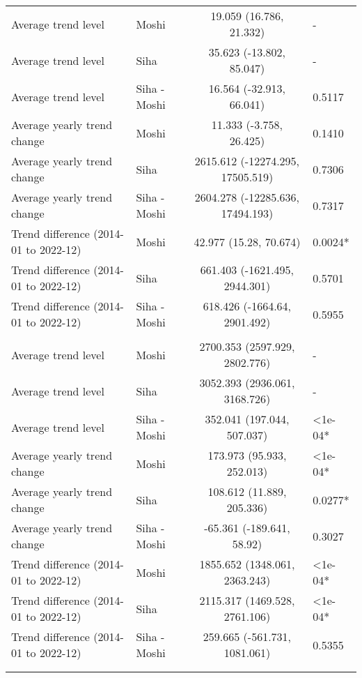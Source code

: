 \begin{longtable}{l|lcl}
\midrule\addlinespace[2.5pt]
\multicolumn{4}{l}{Typhoid} \\ 
\midrule\addlinespace[2.5pt]
Average trend level & Moshi & 19.059 (16.786, 21.332) & - \\ 
Average trend level & Siha & 35.623 (-13.802, 85.047) & - \\ 
Average trend level & Siha - Moshi & 16.564 (-32.913, 66.041) & 0.5117 \\ 
Average yearly trend change & Moshi & 11.333 (-3.758, 26.425) & 0.1410 \\ 
Average yearly trend change & Siha & 2615.612 (-12274.295, 17505.519) & 0.7306 \\ 
Average yearly trend change & Siha - Moshi & 2604.278 (-12285.636, 17494.193) & 0.7317 \\ 
Trend difference (2014-01 to 2022-12) & Moshi & 42.977 (15.28, 70.674) & 0.0024* \\ 
Trend difference (2014-01 to 2022-12) & Siha & 661.403 (-1621.495, 2944.301) & 0.5701 \\ 
Trend difference (2014-01 to 2022-12) & Siha - Moshi & 618.426 (-1664.64, 2901.492) & 0.5955 \\ 
\midrule\addlinespace[2.5pt]
\multicolumn{4}{l}{Upper Respiratory Infections} \\ 
\midrule\addlinespace[2.5pt]
Average trend level & Moshi & 2700.353 (2597.929, 2802.776) & - \\ 
Average trend level & Siha & 3052.393 (2936.061, 3168.726) & - \\ 
Average trend level & Siha - Moshi & 352.041 (197.044, 507.037) & <1e-04* \\ 
Average yearly trend change & Moshi & 173.973 (95.933, 252.013) & <1e-04* \\ 
Average yearly trend change & Siha & 108.612 (11.889, 205.336) & 0.0277* \\ 
Average yearly trend change & Siha - Moshi & -65.361 (-189.641, 58.92) & 0.3027 \\ 
Trend difference (2014-01 to 2022-12) & Moshi & 1855.652 (1348.061, 2363.243) & <1e-04* \\ 
Trend difference (2014-01 to 2022-12) & Siha & 2115.317 (1469.528, 2761.106) & <1e-04* \\ 
Trend difference (2014-01 to 2022-12) & Siha - Moshi & 259.665 (-561.731, 1081.061) & 0.5355 \\ 
\midrule\addlinespace[2.5pt]
\multicolumn{4}{l}{Urinary Tract Infections} \\ 
\midrule\addlinespace[2.5pt]

\end{longtable}
